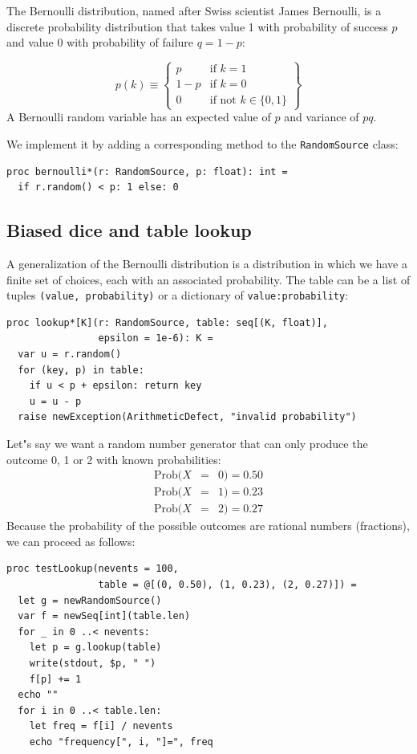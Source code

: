 \documentclass[justified, sixbynine]{tufte-book}
\def\ft{\small\tt}
\theoremstyle{plain}%
\newtheorem * {corollary}{Corollary}
\theoremstyle{definition}
\theoremstyle{remark}
\newtheorem * {remark}{Remark}
\newtheorem * {note}{Note}
\begin{document}
\begin{fullwidth}
The Bernoulli distribution, named after Swiss scientist James Bernoulli, is
a discrete probability distribution that takes value 1 with
probability of success $p$ and value 0 with probability of failure $q=1-p$:

\begin{equation}
p(k) \equiv \left\{
\begin{array}{ll}
p & \text{if }k=1 \\
1-p & \text{if }k=0 \\
0 & \text{if not }k \in \{0, 1\}
\end{array}
\right\}
\end{equation}
A Bernoulli random variable has an expected value of $p$ and variance of $pq$.

We implement it by adding a corresponding method to the {\ft RandomSource} class:

\begin{lstlisting}[caption={in file: {\ft nlib.nim}}]
proc bernoulli*(r: RandomSource, p: float): int =
  if r.random() < p: 1 else: 0
\end{lstlisting}

\goodbreak\subsection{Biased dice and table lookup}

A generalization of the Bernoulli distribution is a distribution in which we have a finite set of choices, each with an associated probability. The table can be a list of tuples {\ft (value, probability)} or a dictionary of {\ft value:probability}:

\begin{lstlisting}[caption={in file: {\ft nlib.nim}}]
proc lookup*[K](r: RandomSource, table: seq[(K, float)],
                epsilon = 1e-6): K =
  var u = r.random()
  for (key, p) in table:
    if u < p + epsilon: return key
    u = u - p
  raise newException(ArithmeticDefect, "invalid probability")
\end{lstlisting}

Let"s say we want a random number generator that can only produce the
outcome 0, 1 or 2 with known probabilities:
\begin{eqnarray}
\textrm{Prob}(X &=&0)=0.50 \\
\textrm{Prob}(X &=&1)=0.23 \\
\textrm{Prob}(X &=&2)=0.27
\end{eqnarray}
Because the probability of the possible outcomes are rational numbers
(fractions), we can proceed as follows:
\begin{lstlisting}
proc testLookup(nevents = 100,
                table = @[(0, 0.50), (1, 0.23), (2, 0.27)]) =
  let g = newRandomSource()
  var f = newSeq[int](table.len)
  for _ in 0 ..< nevents:
    let p = g.lookup(table)
    write(stdout, $p, " ")
    f[p] += 1
  echo ""
  for i in 0 ..< table.len:
    let freq = f[i] / nevents
    echo "frequency[", i, "]=", freq
\end{lstlisting}


\end{fullwidth}
\end{document}
